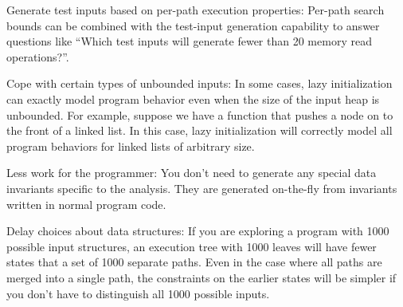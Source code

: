 \begin{compactdesc}
\item[Generate test inputs based on per-path execution properties:] 
Per-path search bounds can be combined with the test-input generation
capability to answer questions like “Which test inputs will generate
fewer than 20 memory read operations?”.

\item[Cope with certain types of unbounded inputs:] 
In some cases, lazy initialization can exactly model program behavior
even when the size of the input heap is unbounded. For example,
suppose we have a function that pushes a node on to the front of a
linked list. In this case, lazy initialization will correctly model
all program behaviors for linked lists of arbitrary size.

\item[Less work for the programmer:] 
You don’t need to generate any special data invariants specific to the
analysis. They are generated on-the-fly from invariants written in
normal program code.

\item[Delay choices about data structures:] 
If you are exploring a program with 1000 possible input structures, an
execution tree with 1000 leaves will have fewer states that a set of
1000 separate paths. Even in the case where all paths are merged into
a single path, the constraints on the earlier states will be simpler
if you don’t have to distinguish all 1000 possible inputs.
\end{compactdesc}

